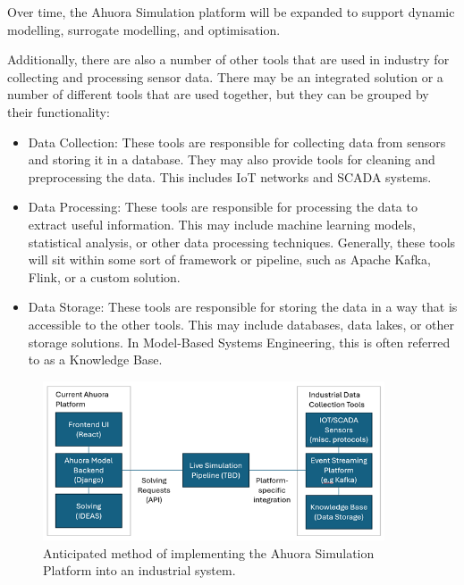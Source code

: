 \documentclass[12pt]{report}
\begin{document}
Over time, the Ahuora Simulation platform will be expanded to support dynamic modelling, surrogate modelling, and optimisation.

Additionally, there are also a number of other tools that are used in industry for collecting and processing sensor data. There may be an integrated solution or a number of different tools that are used together, but they can be grouped by their functionality:
\begin{itemize}
    \item Data Collection: These tools are responsible for collecting data from sensors and storing it in a database. They may also provide tools for cleaning and preprocessing the data. This includes IoT networks and SCADA systems.
    \item Data Processing: These tools are responsible for processing the data to extract useful information. This may include machine learning models, statistical analysis, or other data processing techniques. Generally, these tools will sit within some sort of framework or pipeline, such as Apache Kafka, Flink, or a custom solution.
    \item Data Storage: These tools are responsible for storing the data in a way that is accessible to the other tools. This may include databases, data lakes, or other storage solutions. In Model-Based Systems Engineering, this is often referred to as a Knowledge Base.
\end{itemize}

\begin{figure}
    \centering
    \includegraphics[width=0.9\textwidth]{architecture.png}
    \caption{Anticipated method of implementing the Ahuora Simulation Platform into an industrial system.}
    \label{fig:architecture}
\end{figure}
\end{document}
